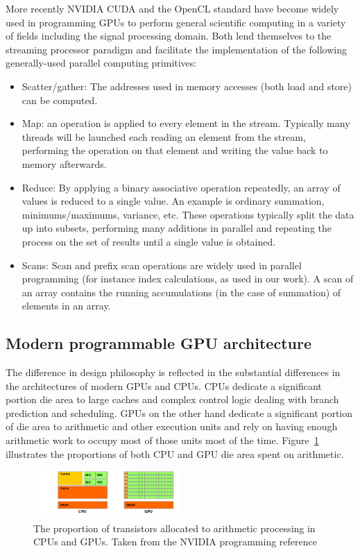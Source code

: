 More recently NVIDIA CUDA \cite{cuda} and the OpenCL standard \cite{opencl} have become widely used in programming GPUs to perform general scientific computing in a variety of fields including the signal 
processing domain. Both lend themselves to the streaming processor paradigm and facilitate the implementation
of the following generally-used parallel computing primitives:
\begin{itemize}
 \item Scatter/gather: The addresses used in memory accesses (both load and store) can be computed.
 \item Map: an operation is applied to every element in the stream. Typically many threads will be launched
       each reading an element from the stream, performing the operation on that element and writing the value
       back to memory afterwards.
 \item Reduce: By applying a binary associative operation repeatedly, an array of values is reduced to a single value.
       An example is ordinary summation, minimums/maximums, variance, etc. These operations typically split the data up into
       subsets, performing many additions in parallel and repeating the process on the set of results until a single value is
       obtained. 
 \item Scans: Scan and prefix scan operations are widely used in parallel programming (for instance index calculations, as used
       in our work). A scan of an array contains the running accumulations (in the case of summation) of elements in an array. 
\end{itemize}

\subsection{Modern programmable GPU architecture}
The difference in design philosophy is reflected in the substantial differences in the architectures of modern GPUs and CPUs. CPUs dedicate a significant portion die area to large caches and complex control logic dealing with
branch prediction and scheduling. GPUs on the other hand dedicate a significant portion of die area to arithmetic and other execution units and rely on having enough arithmetic work to occupy most of those units most of the time.
Figure~\ref{fig_cpu_gpu_diff} illustrates the proportions of both CPU and GPU die area spent on arithmetic.
\begin{figure}[ht!]
 \begin{mdframed}
  \centering
  \includegraphics[width=0.5\textwidth]{images/gpu-devotes-more-transistors-to-data-processing.png}
  \caption[CPU vs. GPU architecture]{The proportion of transistors allocated to arithmetic processing in CPUs and GPUs. Taken from the NVIDIA programming reference \cite{cuda}}
  \label{fig_cpu_gpu_diff}
 \end{mdframed}
\end{figure}

